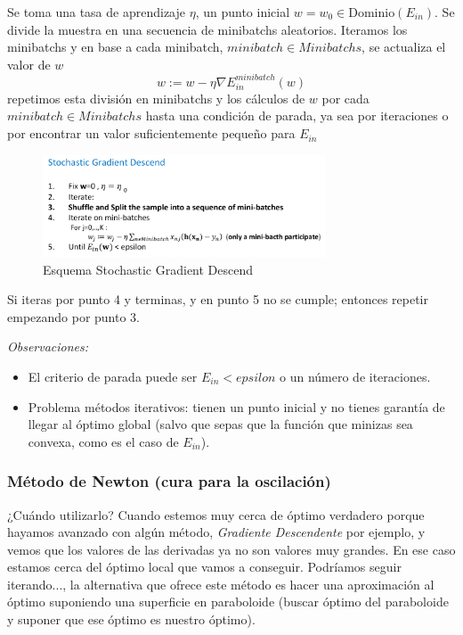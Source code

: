 \documentclass[11pt,a4paper]{article}
\theoremstyle{definition}
\begin{document}
	Se toma una tasa de aprendizaje $\eta$, un punto inicial $w=w_0\in \text{Dominio}(E_{in})$. Se divide la muestra en una secuencia de minibatchs aleatorios. Iteramos los minibatchs y en base a cada minibatch, $minibatch \in Minibatchs$, se actualiza el valor de $w$
	$$w:=w-\eta \nabla E_{in}^{minibatch}(w)$$
	repetimos esta división en minibatchs y los cálculos de $w$ por cada $minibatch \in Minibatchs$ hasta una condición de parada, ya sea por iteraciones o por encontrar un valor suficientemente pequeño para $E_{in}$\\
	
	\begin{figure}[H]
	\centering
	\includegraphics[width=0.75\textwidth]{images/Sto_GD}
	\caption{Esquema Stochastic Gradient Descend}
	\end{figure}	
	
	Si iteras por punto 4 y terminas, y en punto 5 no se cumple; entonces repetir empezando por punto 3.

	\textit{Observaciones:}
	\begin{itemize}
	\item	El criterio de parada puede ser $E_{in} < epsilon$ o un número de iteraciones.
	\item Problema métodos iterativos: tienen un punto inicial y no tienes garantía de llegar al óptimo global (salvo que sepas que la función que minizas sea convexa, como es el caso de $E_{in}$).
	\end{itemize}
	
	\subsubsection{Método de Newton (cura para la oscilación)}
	¿Cuándo utilizarlo? Cuando estemos muy cerca de óptimo verdadero porque hayamos avanzado con algún método, \textit{Gradiente Descendente} por ejemplo, y vemos que los valores de las derivadas ya no son valores muy grandes. En ese caso estamos cerca del óptimo local que vamos a conseguir. Podríamos seguir iterando..., la alternativa que ofrece este método es hacer una aproximación al óptimo suponiendo una superficie en paraboloide (buscar óptimo del paraboloide y suponer que ese óptimo es nuestro óptimo).\\
	
\end{document}
